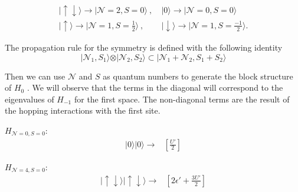 \begin{align}
\vert \uparrow\downarrow\rangle\longrightarrow\vert \mathcal{N}=2,S=0\rangle\ ,& \ \vert0\rangle\longrightarrow\vert \mathcal{N}=0,S=0\rangle \\ 
\vert \uparrow\rangle\longrightarrow\vert \mathcal{N}=1,S=\frac{1}{2}\rangle\ ,& \ \vert \downarrow \rangle\longrightarrow\vert \mathcal{N}=1,S=\frac{-1}{2}\rangle.
\end{align}

The propagation rule for the symmetry is defined with the following identity 
\begin{equation}
  \vert \mathcal{N}_{1},S_{1}\rangle\otimes\vert \mathcal{N}_{2},S_{2}\rangle\subset\vert \mathcal{N}_{1}+\mathcal{N}_{2},S_{1}+S_{2}\rangle \label{eq:PropRuleQD}
\end{equation} 
  

 \noindent Then we can use  $\mathcal{N}$ and $S$ as quantum numbers to generate the block structure of $H_{0}$ . We will observe that the terms in the diagonal will correspond to the eigenvalues of $H_{-1}$ for the first space. The non-diagonal terms are the result of the hopping interactions with the first site. 

\begin{multicols}{2}

$H_{\mathcal{N}=0,S=0}:$
\[
\begin{array}{c}
\vert0\rangle\vert0\rangle\rightarrow\end{array}\begin{array}{c}
\left[\frac{U'}{2}\right]\end{array}
\]


$H_{\mathcal{N}=4,S=0}:$
\[
\begin{array}{c}
\vert\uparrow\!\downarrow\rangle\vert\uparrow\!\downarrow\rangle\rightarrow\end{array}\begin{array}{c}
\left[2\epsilon'+\frac{3U'}{2}\right]\end{array}
\]


\end{multicols}

